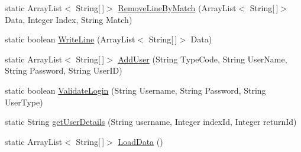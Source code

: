 \begin{DoxyCompactItemize}
\item 
static Array\+List$<$ String\mbox{[}$\,$\mbox{]}$>$ \mbox{\hyperlink{classjsonbasedvoting_1_1_json_based_voting_a6710604aec057cdca50e794f8f3faaee}{Remove\+Line\+By\+Match}} (Array\+List$<$ String\mbox{[}$\,$\mbox{]}$>$ Data, Integer Index, String Match)
\item 
static boolean \mbox{\hyperlink{classjsonbasedvoting_1_1_json_based_voting_a279df688d1148c7b6c9a60477ac5c268}{Write\+Line}} (Array\+List$<$ String\mbox{[}$\,$\mbox{]}$>$ Data)
\item 
static Array\+List$<$ String\mbox{[}$\,$\mbox{]}$>$ \mbox{\hyperlink{classjsonbasedvoting_1_1_json_based_voting_acc4af3eab668970e61d34f68d4df8e2b}{Add\+User}} (String Type\+Code, String User\+Name, String Password, String User\+ID)
\item 
static boolean \mbox{\hyperlink{classjsonbasedvoting_1_1_json_based_voting_a894522ca8e7dce00b4b55f8db6b102fe}{Validate\+Login}} (String Username, String Password, String User\+Type)
\item 
static String \mbox{\hyperlink{classjsonbasedvoting_1_1_json_based_voting_a680b57ed482d3bb4b0427d7219712823}{get\+User\+Details}} (String username, Integer index\+Id, Integer return\+Id)
\item 
static Array\+List$<$ String\mbox{[}$\,$\mbox{]}$>$ \mbox{\hyperlink{classjsonbasedvoting_1_1_json_based_voting_adbcb2c2a084932df90996c7199251579}{Load\+Data}} ()
\end{DoxyCompactItemize}
